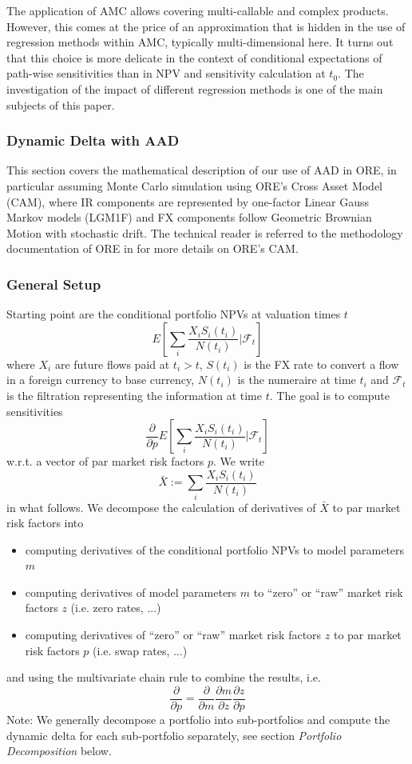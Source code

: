\documentclass[11pt,a4paper,oneside]{article}
\begin{document}
The application of AMC allows covering multi-callable and complex products. However, this comes at
the price of an approximation that is hidden in the use of regression methods within AMC, typically multi-dimensional here.
It turns out that this choice is more delicate in the context of conditional expectations of path-wise sensitivities
than in NPV and sensitivity calculation at $t_0$.
The investigation of the impact of different regression methods is one of the main subjects of this paper.

\subsubsection{Dynamic Delta with AAD}\label{methodology}

This section covers the mathematical description of our use of AAD in ORE, in particular assuming Monte Carlo simulation
using ORE's Cross Asset Model (CAM), where IR components are represented by one-factor Linear Gauss Markov models (LGM1F)
and FX components follow Geometric Brownian Motion with stochastic drift. 
The technical reader is referred to the me\-tho\-do\-lo\-gy documentation of ORE in \cite{ORE-4} for more details on ORE's CAM.

\subsubsection*{General Setup}

Starting point are the conditional portfolio NPVs at valuation times $t$
$$
E\left[ \sum_i \frac{X_i S_i(t_i)}{N(t_i)} \bigg| \mathcal{F}_t \right]
$$
where $X_i$ are future flows paid at $t_i > t$, $S(t_i)$ is the FX rate to convert a flow in a foreign currency to base currency,
$N(t_i)$ is the numeraire at time $t_i$ and $\mathcal{F}_t$ is the filtration representing the information at time $t$.
The goal is to compute sensitivities
$$
\frac{\partial}{\partial p}E\left[ \sum_i \frac{X_i S_i(t_i)}{N(t_i)} \bigg| \mathcal{F}_t \right]
$$
w.r.t. a vector of par market risk factors $p$. We write
$$
\bar{X} := \sum_i \frac{X_i S_i(t_i)}{N(t_i)}
$$
in what follows. We decompose the calculation of derivatives of $\bar{X}$ to par market risk factors into
\begin{itemize}
\item computing derivatives of the conditional portfolio NPVs to model parameters $m$
\item computing derivatives of model parameters $m$ to ``zero'' or ``raw'' market risk factors $z$ (i.e. zero rates, ...)
\item computing derivatives of ``zero'' or ``raw'' market risk factors $z$ to par market risk factors $p$ (i.e. swap rates, ...)
\end{itemize}
and using the multivariate chain rule to combine the results, i.e.
$$
\frac{\partial}{\partial p} = \frac{\partial}{\partial m} \frac{\partial m}{\partial z} \frac{\partial z}{\partial p}
$$
Note: We generally decompose a portfolio into sub-portfolios and compute the dynamic delta for each sub-portfolio
separately, see section {\em Portfolio Decomposition} below.
\end{document}
